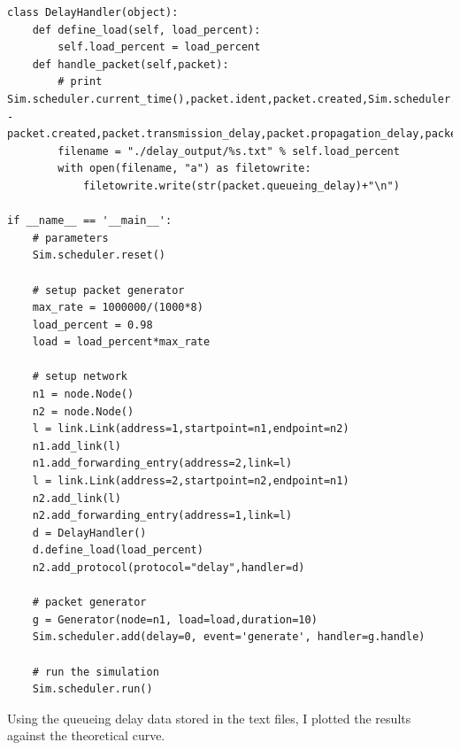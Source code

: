 \documentclass[11pt]{article}
\begin{document}
\vspace{0.5cm}
\begin{lstlisting}
class DelayHandler(object):
    def define_load(self, load_percent):
        self.load_percent = load_percent
    def handle_packet(self,packet):
        # print Sim.scheduler.current_time(),packet.ident,packet.created,Sim.scheduler.current_time() - packet.created,packet.transmission_delay,packet.propagation_delay,packet.queueing_delay
        filename = "./delay_output/%s.txt" % self.load_percent
        with open(filename, "a") as filetowrite:
            filetowrite.write(str(packet.queueing_delay)+"\n")

if __name__ == '__main__':
    # parameters
    Sim.scheduler.reset()
    
    # setup packet generator
    max_rate = 1000000/(1000*8)
    load_percent = 0.98
    load = load_percent*max_rate

    # setup network
    n1 = node.Node()
    n2 = node.Node()
    l = link.Link(address=1,startpoint=n1,endpoint=n2)
    n1.add_link(l)
    n1.add_forwarding_entry(address=2,link=l)
    l = link.Link(address=2,startpoint=n2,endpoint=n1)
    n2.add_link(l)
    n2.add_forwarding_entry(address=1,link=l)
    d = DelayHandler()
    d.define_load(load_percent)
    n2.add_protocol(protocol="delay",handler=d)

    # packet generator
    g = Generator(node=n1, load=load,duration=10)
    Sim.scheduler.add(delay=0, event='generate', handler=g.handle)
    
    # run the simulation
    Sim.scheduler.run()
\end{lstlisting}
\vspace{0.5cm}

Using the queueing delay data stored in the text files, I plotted the results against the theoretical curve. 
\end{document}
